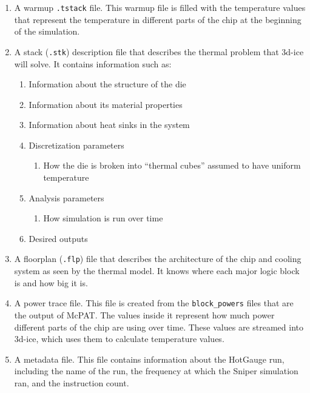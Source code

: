 \documentclass[11pt]{article}
\begin{document}
\begin{enumerate}[leftmargin=2em]
    \item A warmup \texttt{.tstack} file. This warmup file is filled with the temperature values that represent the temperature in different parts of the chip at the beginning of the simulation.
    
    \item A stack (\texttt{.stk}) description file that describes the thermal problem that 3d-ice will solve. It contains information such as:
    \begin{enumerate}[label=\alph*)]
        \item Information about the structure of the die
        \item Information about its material properties
        \item Information about heat sinks in the system
        \item Discretization parameters
        \begin{enumerate}[label=\roman*)]
            \item How the die is broken into ``thermal cubes'' assumed to have uniform temperature
        \end{enumerate}
        \item Analysis parameters
        \begin{enumerate}[label=\roman*)]
            \item How simulation is run over time
        \end{enumerate}
        \item Desired outputs
    \end{enumerate}
    
    \item A floorplan (\texttt{.flp}) file that describes the architecture of the chip and cooling system as seen by the thermal model. It knows where each major logic block is and how big it is.
    
    \item A power trace file. This file is created from the \texttt{block\_powers} files that are the output of McPAT. The values inside it represent how much power different parts of the chip are using over time. These values are streamed into 3d-ice, which uses them to calculate temperature values.
    
    \item A metadata file. This file contains information about the HotGauge run, including the name of the run, the frequency at which the Sniper simulation ran, and the instruction count.
\end{enumerate}
\end{document}
